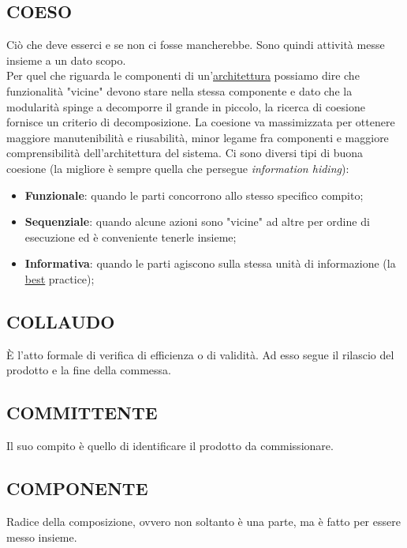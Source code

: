 		\subsection{COESO}  \label{coeso}
		Ciò che deve esserci e se non ci fosse mancherebbe. Sono quindi attività messe insieme a un dato scopo. \\
		Per quel che riguarda le componenti di un'\underline{\hyperref[architettura]{architettura}} possiamo dire che funzionalità "vicine" devono stare nella stessa componente e dato che la modularità spinge a decomporre il grande in piccolo, la ricerca di coesione fornisce un criterio di decomposizione. La coesione va massimizzata per ottenere maggiore manutenibilità e riusabilità, minor legame fra componenti e maggiore comprensibilità dell’architettura del sistema. Ci sono diversi tipi di buona coesione (la migliore è sempre quella che persegue \textit{information hiding}):
			\begin{itemize}
				\item \textbf{Funzionale}: quando le parti concorrono allo stesso specifico compito;
				\item \textbf{Sequenziale}: quando alcune azioni sono "vicine" ad altre per ordine di esecuzione ed è conveniente tenerle insieme;
				\item \textbf{Informativa}: quando le parti agiscono sulla stessa unità di informazione (la \underline{\hyperref[best]{best}} practice);
			\end{itemize}
		
		\subsection{COLLAUDO}		\label{collaudo}
		È l'atto formale di verifica di efficienza o di validità.  Ad esso segue il rilascio del prodotto e la fine della commessa.
		
		\subsection{COMMITTENTE}  \label{committente}
		Il suo compito è quello di identificare il prodotto da commissionare.
		
		\subsection{COMPONENTE}  \label{componente}
		Radice della composizione, ovvero non soltanto è una parte, ma è fatto per essere messo insieme.	
		
